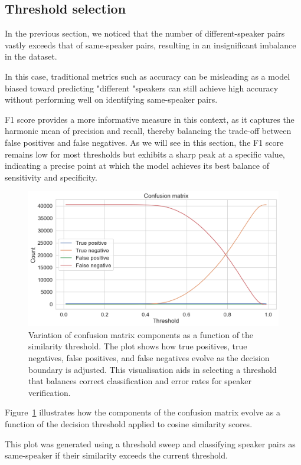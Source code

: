 \documentclass[conference]{IEEEtran}
\begin{document}
\subsection{Threshold selection}

In the previous section, we noticed that the number of different-speaker pairs vastly exceeds that of same-speaker pairs, resulting in an insignificant imbalance in the dataset.

In this case, traditional metrics such as accuracy can be misleading as a model biased toward predicting "different "speakers can still achieve high accuracy without performing well on identifying same-speaker pairs. 

F1 score provides a more informative measure in this context,  as it captures the harmonic mean of precision and recall, thereby balancing the trade-off between false positives and false negatives. As we will see in this section, the F1 score remains low for most thresholds but exhibits a sharp peak at a specific value, indicating a precise point at which the model achieves its best balance of sensitivity and specificity. 


\begin{figure}[H]
	\centering
	\includegraphics[width=0.7\linewidth]{img/img-confusion-matrix}
	\caption{Variation of confusion matrix components as a function of the similarity threshold. The plot shows how true positives, true negatives, false positives, and false negatives evolve as the decision boundary is adjusted. This visualisation aids in selecting a threshold that balances correct classification and error rates for speaker verification.}
	\label{fig:img-confusion-matrix}
\end{figure}


Figure~\ref{fig:img-confusion-matrix} illustrates how the components of the confusion matrix evolve as a function of the decision threshold applied to cosine similarity scores.

This plot was generated using a threshold sweep and classifying speaker pairs as same-speaker if their similarity exceeds the current threshold.
\end{document}
